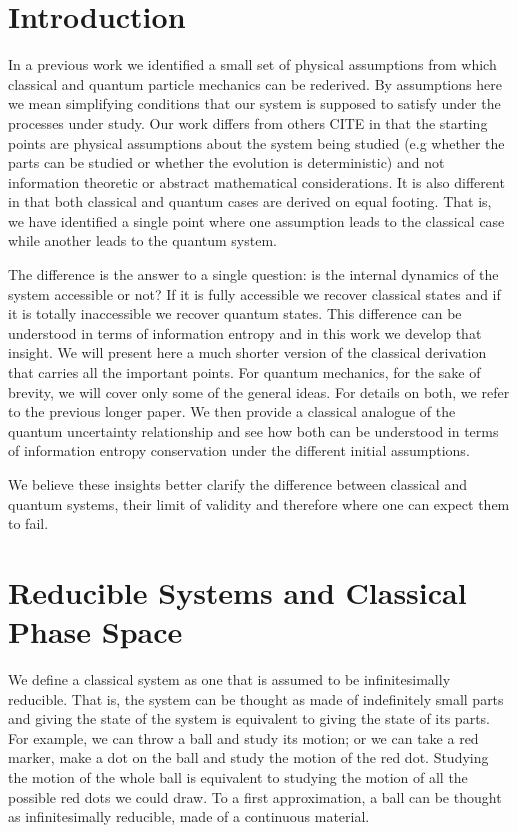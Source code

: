 \documentclass{ws-ijqi}
\begin{document}
\section{Introduction}
In a previous work\cite{Carc1} we identified a small set of physical assumptions from which classical and quantum particle mechanics can be rederived. By assumptions here we mean simplifying conditions that our system is supposed to satisfy under the processes under study. Our work differs from others\cite{PhysRevA.84.012311} CITE in that the starting points are physical assumptions about the system being studied (e.g whether the parts can be studied or whether the evolution is deterministic) and not information theoretic or abstract mathematical  considerations. It is also different in that both classical and quantum cases are derived on equal footing. That is, we have identified a single point where one assumption leads to the classical case while another leads to the quantum system.

The difference is the answer to a single question: is the internal dynamics of the system accessible or not? If it is fully accessible we recover classical states and if it is totally inaccessible we recover quantum states. This difference can be understood in terms of information entropy and in this work we develop that insight. We will present here a much shorter version of the classical derivation that carries all the important points. For quantum mechanics, for the sake of brevity, we will cover only some of the general ideas. For details on both, we refer to the previous longer paper\cite{Carc1}. We then provide a classical analogue of the quantum uncertainty relationship and see how both can be understood in terms of information entropy conservation under the different initial assumptions.

We believe these insights better clarify the difference between classical and quantum systems, their limit of validity and therefore where one can expect them to fail.

\section{Reducible Systems and Classical Phase Space}
We define a classical system as one that is assumed to be infinitesimally reducible. That is, the system can be thought as made of indefinitely small parts and giving the state of the system is equivalent to giving the state of its parts. For example, we can throw a ball and study its motion; or we can take a red marker, make a dot on the ball and study the motion of the red dot. Studying the motion of the whole ball is equivalent to studying the motion of all the possible red dots we could draw. To a first approximation, a ball can be thought as infinitesimally reducible, made of a continuous material.
\end{document}
